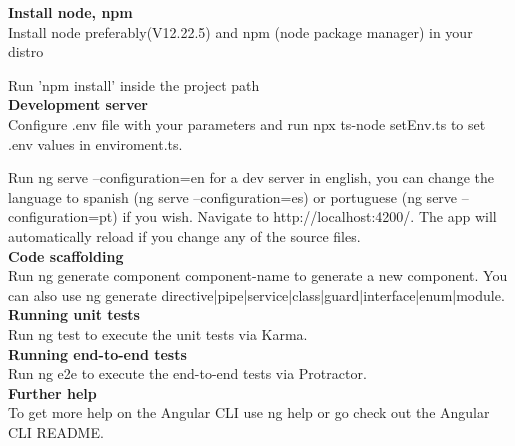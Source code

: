 \textbf{Install node, npm}\\
Install node preferably(V12.22.5) and npm (node package manager) in your distro

Run 'npm install' inside the project path\\

\textbf{Development server}\\
Configure .env file with your parameters and run npx ts-node setEnv.ts to set .env values in enviroment.ts.

Run ng serve --configuration=en for a dev server in english, you can change the language to spanish (ng serve --configuration=es) or portuguese (ng serve --configuration=pt) if you wish. Navigate to http://localhost:4200/. The app will automatically reload if you change any of the source files.\\

\textbf{Code scaffolding}\\
Run ng generate component component-name to generate a new component. You can also use ng generate directive|pipe|service|class|guard|interface|enum|module.\\


\textbf{Running unit tests}\\
Run ng test to execute the unit tests via Karma.\\

\textbf{Running end-to-end tests}\\
Run ng e2e to execute the end-to-end tests via Protractor.\\

\textbf{Further help}\\
To get more help on the Angular CLI use ng help or go check out the Angular CLI README.\\

